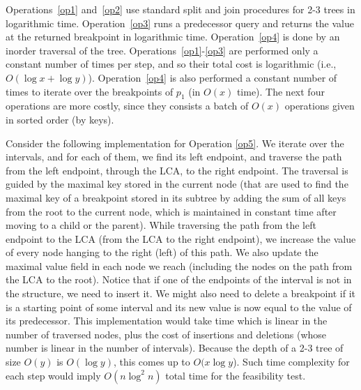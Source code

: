 \documentclass[a4paper,UKenglish]{lipics-v2016}
\theoremstyle{plain}
\begin{document}
Operations~\ref{op1} and~\ref{op2} use standard split and join procedures for 2-3 trees in logarithmic time. 
Operation~\ref{op3} runs a predecessor query and returns the value at the returned breakpoint in logarithmic time.
Operation~\ref{op4} is done by an inorder traversal of the tree. 
Operations~\ref{op1}-\ref{op3} are performed only a constant number of times per step, and so their total cost is logarithmic (i.e., $O(\log x + \log y)$). Operation~\ref{op4} is also performed a constant number of times to iterate over the breakpoints of $p_{1}$ (in $O(x)$ time). The next four operations are more costly, since they consists a batch of $O(x)$ operations given in sorted order (by keys).

\vspace{0.04in} 
Consider the following implementation for Operation \ref{op5}. We iterate over the intervals, and for each of them, we find its left endpoint, and traverse the path from the left endpoint, through the LCA, to the right endpoint.
The traversal is guided by the maximal key stored in the current node (that are used to find the maximal key of a breakpoint stored in its subtree
by adding the sum of all keys from the root to the current node, which is maintained in constant time after moving to a child or the parent).
While traversing the path from the left endpoint to the LCA (from the LCA to the right endpoint), we increase the value of every node hanging to the right (left) of this path. We also update the maximal value field in each node we reach (including the nodes on the path from the LCA to the root). Notice that if one of the endpoints of the interval is not in the structure, we need to insert it. We might also need to delete a breakpoint if it is a starting point of some interval and its new value is now equal to the value of its predecessor. This implementation would take time which is linear in the number of traversed nodes, plus the cost of insertions and deletions (whose number is linear in the number of intervals). Because the depth of a 2-3 tree of size $O(y)$ is $O(\log y)$, this comes up to $O(x \log y$). Such time complexity for each step would imply $O(n\log^{2}n)$ total time for the feasibility test.
\end{document}
